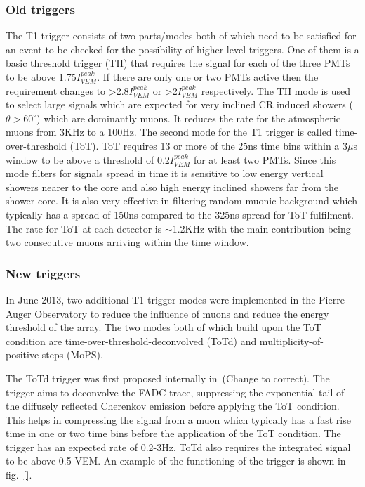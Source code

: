 \subsubsection{Old triggers}
\label{sec:Sur_det_trig_old}
The T1 trigger consists of two parts/modes both of which need to be satisfied for an event to be checked for the possibility of higher level triggers. One of them is a basic threshold trigger (TH) that requires the signal for each of the three PMTs to be above 1.75$I_{VEM}^{peak}$. If there are only one or two PMTs active then the requirement changes to >2.8$I_{VEM}^{peak}$ or >2$I_{VEM}^{peak}$ respectively. The TH mode is used to select large signals which are expected for very inclined CR induced showers ($\theta >60^{\circ}$) which are dominantly muons. It reduces the rate for the atmospheric muons from 3KHz to a 100Hz. The second mode for the T1 trigger is called time-over-threshold (ToT). ToT requires 13 or more of the 25ns time bins within a 3$\mu$s window to be above a threshold of 0.2$I_{VEM}^{peak}$ for at least two PMTs. Since this mode filters for signals spread in time it is sensitive to low energy vertical showers nearer to the core and also high energy inclined showers far from the shower core. It is also very effective in filtering random muonic background which typically has a spread of 150ns compared to the 325ns spread for ToT fulfilment. The rate for ToT at each detector is $\sim$1.2KHz with the main contribution being two consecutive muons arriving within the time window. 

\subsubsection{New triggers}
\label{sec:Sur_det_trig_new}
In June 2013, two additional T1 trigger modes were implemented in the Pierre Auger Observatory to reduce the influence of muons and reduce the energy threshold of the array. The two modes both of which build upon the ToT condition are time-over-threshold-deconvolved (ToTd) and multiplicity-of-positive-steps (MoPS).

The ToTd trigger was first proposed internally in~\cite{gap_note_2011}(Change to correct). The trigger aims to deconvolve the FADC trace, suppressing the exponential tail of the diffusely reflected Cherenkov emission before applying the ToT condition. This helps in compressing the signal from a muon which typically has a fast rise time in one or two time bins before the application of the ToT condition. The trigger has an expected rate of 0.2-3Hz. ToTd also requires the integrated signal to be above 0.5 VEM. An example of the functioning of the trigger is shown in fig.~\ref{}. 

